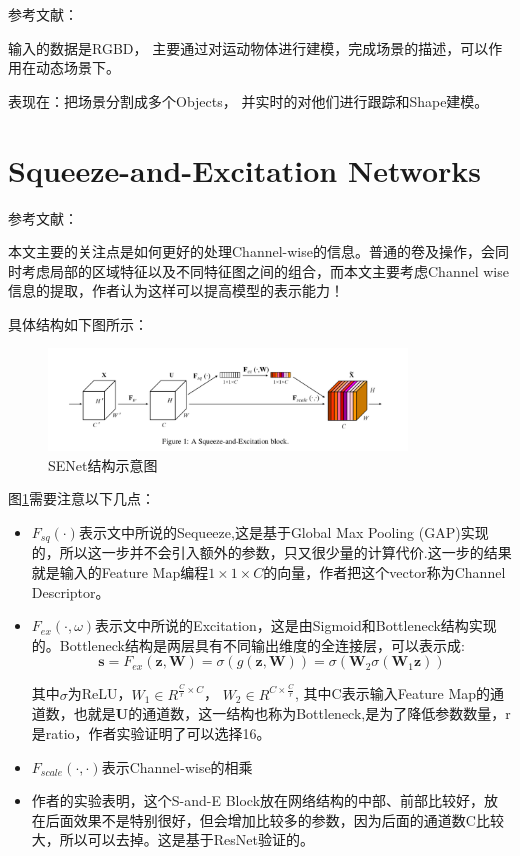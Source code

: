 参考文献：\cite{runz2017co}

输入的数据是RGBD， 主要通过对运动物体进行建模，完成场景的描述，可以作用在动态场景下。

表现在：把场景分割成多个Objects， 并实时的对他们进行跟踪和Shape建模。


\section{Squeeze-and-Excitation Networks}

参考文献：\cite{senet2017hu}

本文主要的关注点是如何更好的处理Channel-wise的信息。普通的卷及操作，会同时考虑局部的区域特征以及不同特征图之间的组合，而本文主要考虑Channel wise信息的提取，作者认为这样可以提高模型的表示能力！

具体结构如下图所示：
\begin{figure}[!hbtp]
\centering
\includegraphics[width=0.85\textwidth]{SemanticSLAM/SENet0.png}
\caption{SENet结构示意图}
\label{SENet0}
\end{figure}

图\ref{SENet0}需要注意以下几点：
\begin{itemize}
\item $F_{sq}(\cdot)$表示文中所说的Sequeeze,这是基于Global Max Pooling (GAP)实现的，所以这一步并不会引入额外的参数，只又很少量的计算代价.这一步的结果就是输入的Feature Map编程$1 \times 1 \times C$的向量，作者把这个vector称为Channel Descriptor。
\item $F_{ex}(\cdot, \omega)$表示文中所说的Excitation，这是由Sigmoid和Bottleneck结构实现的。Bottleneck结构是两层具有不同输出维度的全连接层，可以表示成:
\begin{displaymath}
\mathbf{s} = F_{ex}(\mathbf{z}, \mathbf{W})=\sigma(g(\mathbf{z}, \mathbf{W})) = \sigma(\mathbf{W}_2 \sigma (\mathbf{W}_1 \mathbf{z}))
\end{displaymath}


其中$\sigma$为ReLU，$W_1 \in R^{\frac{C}{r}\times C}$， $W_2 \in R^{C \times \frac{C}{r}}$, 其中C表示输入Feature Map的通道数，也就是$\mathbf{U}$的通道数，这一结构也称为Bottleneck,是为了降低参数数量，r是ratio，作者实验证明了可以选择16。

\item $F_{scale}(\cdot, \cdot)$表示Channel-wise的相乘

\item 作者的实验表明，这个S-and-E Block放在网络结构的中部、前部比较好，放在后面效果不是特别很好，但会增加比较多的参数，因为后面的通道数C比较大，所以可以去掉。这是基于ResNet验证的。
\end{itemize}

